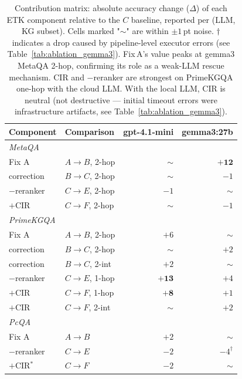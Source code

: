 %
\begin{table}[t]
\centering
\small
\caption{Contribution matrix: absolute accuracy change ($\Delta$) of each ETK component relative to the $C$ baseline, reported per (LLM, KG subset). Cells marked "$\sim$" are within $\pm 1$\,pt noise. $\dagger$ indicates a drop caused by pipeline-level executor errors (see Table~\ref{tab:ablation_gemma3}). Fix\,A's value peaks at gemma3 MetaQA 2-hop, confirming its role as a weak-LLM rescue mechanism. CIR and $-$reranker are strongest on PrimeKGQA one-hop with the cloud LLM. With the local LLM, CIR is neutral (not destructive --- initial timeout errors were infrastructure artifacts, see Table~\ref{tab:ablation_gemma3}).}
\label{tab:contribution_matrix}
\begin{tabular}{l l r r}
\toprule
Component & Comparison & gpt-4.1-mini & gemma3:27b \\
\midrule
\multicolumn{4}{l}{\textit{MetaQA}} \\
\quad Fix A                  & $A\to B$, 2-hop       & $\sim$       & $\mathbf{+12}$ \\
\quad correction             & $B\to C$, 2-hop       & $\sim$       & $-1$ \\
\quad $-$reranker            & $C\to E$, 2-hop       & $-1$         & $\sim$ \\
\quad $+$CIR                 & $C\to F$, 2-hop       & $\sim$       & $-1$ \\
\midrule
\multicolumn{4}{l}{\textit{PrimeKGQA}} \\
\quad Fix A                  & $A\to B$, 2-hop       & $+6$         & $\sim$ \\
\quad correction             & $B\to C$, 2-hop       & $\sim$       & $+2$ \\
\quad correction             & $B\to C$, 2-int       & $+2$         & $\sim$ \\
\quad $-$reranker            & $C\to E$, 1-hop       & $\mathbf{+13}$ & $+4$ \\
\quad $+$CIR                 & $C\to F$, 1-hop       & $\mathbf{+8}$  & $+1$ \\
\quad $+$CIR                 & $C\to F$, 2-int       & $\sim$       & $+2$ \\
\midrule
\multicolumn{4}{l}{\textit{PcQA}} \\
\quad Fix A                  & $A\to B$              & $+2$         & $\sim$ \\
\quad $-$reranker            & $C\to E$              & $-2$         & $-4^\dagger$ \\
\quad $+$CIR$^*$             & $C\to F$              & $-2$         & $\sim$ \\
\bottomrule
\end{tabular}
\end{table}
